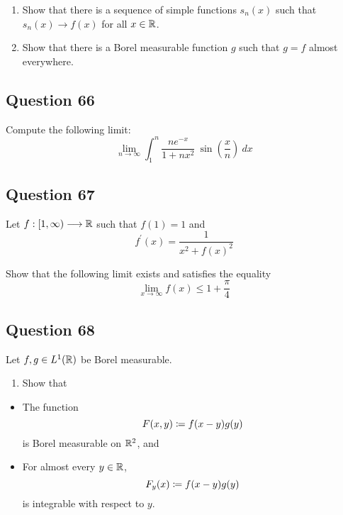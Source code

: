 \documentclass[12pt]{article}
\providecommand{\tightlist}{%
  \setlength{\itemsep}{0pt}\setlength{\parskip}{0pt}}
\begin{document}
\begin{enumerate}
\def\labelenumi{\arabic{enumi}.}
\tightlist
\item
  Show that there is a sequence of simple functions \(s_n(x)\) such that
  \(s_n(x) \to f(x)\) for all \(x\in {\mathbb{R}}\).
\item
  Show that there is a Borel measurable function \(g\) such that
  \(g = f\) almost everywhere.
\end{enumerate}

\hypertarget{question-66-1}{%
\subsection{Question 66}\label{question-66-1}}

Compute the following limit: \[
\lim _{n \rightarrow \infty} \int_{1}^{n} \frac{n e^{-x}}{1+n x^{2}} ~\sin \left(\frac x n\right) ~d x
\]

\hypertarget{question-67-1}{%
\subsection{Question 67}\label{question-67-1}}

Let \(f: [1, \infty) \longrightarrow {\mathbb{R}}\) such that \(f(1) = 1\) and \[
f^{\prime}(x)= \frac{1} {x^{2}+f(x)^{2}}
\]

Show that the following limit exists and satisfies the equality \[
\lim _{x \rightarrow \infty} f(x) \leq 1 + \frac \pi 4
\]

\hypertarget{question-68-1}{%
\subsection{Question 68}\label{question-68-1}}

Let \(f, g \in L^1({\mathbb{R}})\) be Borel measurable.

\begin{enumerate}
\def\labelenumi{\arabic{enumi}.}
\tightlist
\item
  Show that
\end{enumerate}

\begin{itemize}
\tightlist
\item
  The function \[F(x, y) \coloneqq f(x-y) g(y)\] is Borel measurable on
  \({\mathbb{R}}^2\), and
\item
  For almost every \(y\in {\mathbb{R}}\), \[F_y(x) \coloneqq f(x-y)g(y)\] is
  integrable with respect to \(y\).
\end{itemize}
\end{document}
